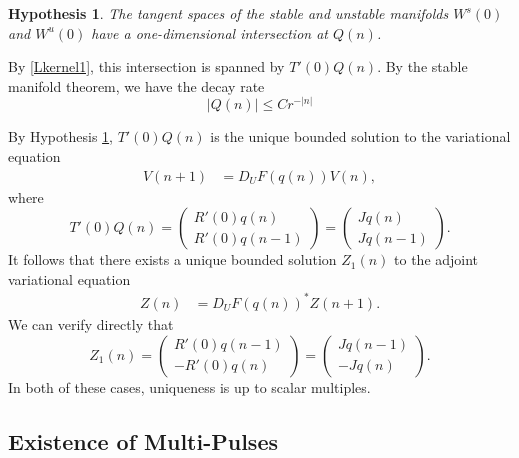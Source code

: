 \documentclass[12pt]{article}
\newtheorem{hypothesis}{Hypothesis}
\begin{document}
\begin{hypothesis}\label{intersectionhyp}
The tangent spaces of the stable and unstable manifolds $W^s(0)$ and $W^u(0)$ have a one-dimensional intersection at $Q(n)$.
\end{hypothesis}

\noindent By \eqref{Lkernel1}, this intersection is spanned by $T'(0)Q(n)$. By the stable manifold theorem, we have the decay rate
\begin{equation}\label{Qdecay}
|Q(n)| \leq C r^{-|n|}
\end{equation}

By Hypothesis \ref{intersectionhyp}, $T'(0) Q(n)$ is the unique bounded solution to the variational equation
\begin{align*}
V(n+1) &= D_U F(q(n)) V(n),
\end{align*}
where
\begin{equation}\label{varsol}
T'(0) Q(n) = \begin{pmatrix} R'(0) q(n) \\ R'(0) q(n-1) \end{pmatrix} = \begin{pmatrix} J q(n) \\ J q(n-1) \end{pmatrix}.
\end{equation}
It follows that there exists a unique bounded solution $Z_1(n)$ to the adjoint variational equation
\begin{align*}
Z(n) &= D_U F(q(n))^* Z(n+1).
\end{align*}
We can verify directly that
\begin{equation}\label{adjvarsol}
Z_1(n) = \begin{pmatrix} R'(0) q(n-1) \\ -R'(0) q(n) \end{pmatrix} = \begin{pmatrix} J q(n-1) \\ -J q(n) \end{pmatrix}.
\end{equation}
In both of these cases, uniqueness is up to scalar multiples.

\subsection{Existence of Multi-Pulses}
\end{document}
